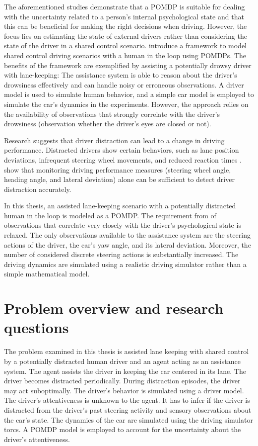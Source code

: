 The aforementioned studies demonstrate that a POMDP is suitable for dealing with the uncertainty related to a person's internal psychological state and that this can be beneficial for making the right decisions when driving. However, the focus lies on estimating the state of external drivers rather than considering the state of the driver in a shared control scenario. \cite{hitl_pomdp} introduce a framework to model shared control driving scenarios with a human in the loop using POMDPs. The benefits of the framework are exemplified by assisting a potentially drowsy driver with lane-keeping: The assistance system is able to reason about the driver's drowsiness effectively and can handle noisy or erroneous observations. A driver model is used to simulate human behavior, and a simple car model is employed to simulate the car's dynamics in the experiments. However, the approach relies on the availability of observations that strongly correlate with the driver's drowsiness (observation whether the driver's eyes are closed or not).

Research suggests that driver distraction can lead to a change in driving performance. Distracted drivers show certain behaviors, such as lane position deviations, infrequent steering wheel movements, and reduced reaction times \parencite{driver-distraction-review}. \cite{dist-det-perf} show that monitoring driving performance measures (steering wheel angle, heading angle, and lateral deviation) alone can be sufficient to detect driver distraction accurately.

In this thesis, an assisted lane-keeping scenario with a potentially distracted human in the loop is modeled as a POMDP. The requirement from \cite{hitl_pomdp} of observations that correlate very closely with the driver's psychological state is relaxed. The only observations available to the assistance system are the steering actions of the driver, the car's yaw angle, and its lateral deviation. Moreover, the number of considered discrete steering actions is substantially increased. The driving dynamics are simulated using a realistic driving simulator rather than a simple mathematical model.

\section{Problem overview and research questions}

The problem examined in this thesis is assisted lane keeping with shared control by a potentially distracted human driver and an agent acting as an assistance system. The agent assists the driver in keeping the car centered in its lane. The driver becomes distracted periodically. During distraction episodes, the driver may act suboptimally. The driver's behavior is simulated using a driver model. The driver’s attentiveness is unknown to the agent. It has to infer if the driver is distracted from the driver's past steering activity and sensory observations about the car's state. The dynamics of the car are simulated using the driving simulator \Gls{torcs}. A POMDP model is employed to account for the uncertainty about the driver's attentiveness.

